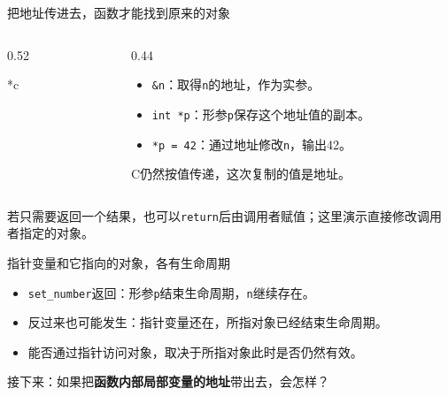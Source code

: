 \begin{frame}{把地址传进去，函数才能找到原来的对象}
\begin{columns}[c]
\begin{column}{0.52\textwidth}
\begin{Code}*{c}\end{Code}
\end{column}
\begin{column}{0.44\textwidth}
\begin{itemize}
    \item \texttt{\&n}：取得\texttt{n}的地址，作为实参。
    \item \texttt{int *p}：形参\texttt{p}保存这个地址值的副本。
    \item \texttt{*p = 42}：通过地址修改\texttt{n}，输出42。
\end{itemize}
\medskip\alert{C仍然按值传递，这次复制的值是地址。}
\end{column}
\end{columns}
\medskip 若只需要返回一个结果，也可以\texttt{return}后由调用者赋值；这里演示直接修改调用者指定的对象。
\end{frame}

\begin{frame}{指针变量和它指向的对象，各有生命周期}
\begin{center}
\end{center}
\begin{itemize}
    \item \texttt{set\_number}返回：形参\texttt{p}结束生命周期，\texttt{n}继续存在。
    \item 反过来也可能发生：指针变量还在，所指对象已经结束生命周期。
    \item \alert{能否通过指针访问对象，取决于所指对象此时是否仍然有效。}
\end{itemize}
\medskip 接下来：如果把\textbf{函数内部局部变量的地址}带出去，会怎样？
\end{frame}

